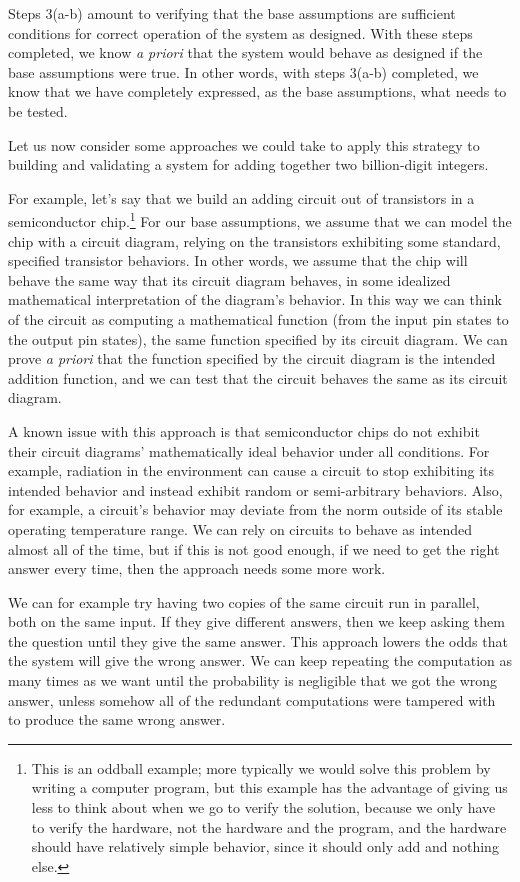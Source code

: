 \documentclass[11pt]{article}
\begin{document}
Steps 3(a-b) amount to verifying that the base assumptions are sufficient conditions
for correct operation of the system as designed. With these steps completed, we know
\emph{a priori}\/ that the system would behave as designed if the base assumptions were
true. In other words, with steps 3(a-b) completed, we know that we have completely
expressed, as the base assumptions, what needs to be tested.

Let us now consider some approaches we could take to apply this strategy to building
and validating a system for adding together two billion-digit integers.

For example, let's say that we build an adding circuit out of transistors in a
semiconductor chip.\footnote{This is an oddball example; more typically we would solve this
problem by writing a computer program, but this example has the advantage of giving
us less to think about when we go to verify the solution, because we only have
to verify the hardware, not the hardware and the program, and the hardware should
have relatively simple behavior, since it should only add and nothing else.}
For our base assumptions, we assume that we can model the chip with a circuit diagram,
relying on the transistors exhibiting some standard, specified transistor behaviors.
In other words, we assume that the chip will behave the same way that its circuit diagram
behaves, in some idealized mathematical interpretation of the diagram's behavior.
In this way we can think of the circuit as computing a mathematical function (from
the input pin states to the output pin states), the same function specified by its
circuit diagram. We can prove \emph{a priori}\/ that the function specified by the
circuit diagram is the intended addition function, and we can test that
the circuit behaves the same as its circuit diagram.

A known issue with this approach is that semiconductor chips do not exhibit
their circuit diagrams' mathematically ideal behavior under all conditions. For
example, radiation in the environment can cause a circuit to stop exhibiting
its intended behavior and instead exhibit random or semi-arbitrary behaviors.
Also, for example, a circuit's behavior may deviate from the norm outside of its
stable operating temperature range. We can rely on circuits to behave as intended
almost all of the time, but if this is not good enough, if we need to get the
right answer every time, then the approach needs some more work.

We can for example try having two copies of the same circuit run in parallel,
both on the same input. If they give different answers, then we keep asking
them the question until they give the same answer. This approach lowers the
odds that the system will give the wrong answer. We can keep repeating the
computation as many times as we want until the probability is negligible that
we got the wrong answer, unless somehow all of the redundant computations
were tampered with to produce the same wrong answer.
\end{document}
